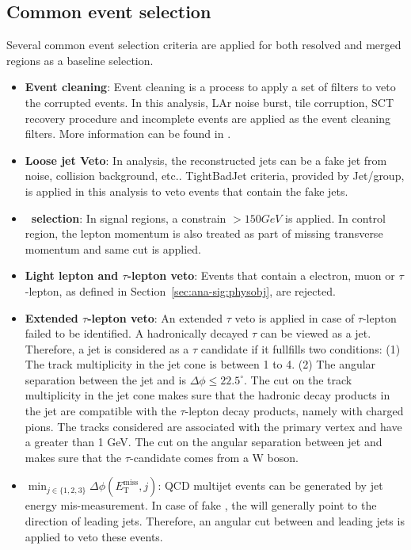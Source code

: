 \subsection{Common event selection}
\par Several common event selection criteria are applied for both resolved and merged regions as a baseline selection.
\begin{itemize}
    \item \textbf{Event cleaning}: Event cleaning is a process to apply a set of filters to veto the corrupted events. In this analysis, LAr noise burst, tile corruption, SCT recovery procedure and incomplete events are applied as the event cleaning filters. More information can be found in \cite{c8-evt-cleaning}.
    \item \textbf{Loose jet Veto}: In analysis, the reconstructed jets can be a fake jet from noise, collision background, etc.. TightBadJet criteria, provided by Jet/\met group, is applied in this analysis to veto events that contain the fake jets.
    \item \textbf{\met~selection}: In signal regions, a constrain \met $>150GeV$ is applied. In control region, the lepton momentum is also treated as part of missing transverse momentum and same \met cut is applied.
    \item \textbf{Light lepton and $\tau$-lepton veto}: Events that contain a electron, muon or $\tau$-lepton, as defined in Section~\ref{sec:ana-sig:physobj}, are rejected.
    \item \textbf{Extended $\tau$-lepton veto}: An extended $\tau$ veto is applied in case of $\tau$-lepton failed to be identified. A hadronically decayed $\tau$ can be viewed as a jet. Therefore, a jet is considered as a $\tau$ candidate if it fullfills two conditions: (1) The track multiplicity in the jet cone is between 1 to 4. (2) The angular separation between the jet and \met is $\Delta \phi \leq 22.5^\circ$. The cut on the track multiplicity in the jet cone makes sure that the hadronic decay products in the jet are compatible with the $\tau$-lepton decay products, namely with charged pions. The tracks considered are associated with the primary vertex and have a \pt greater than 1 GeV. The cut on the angular separation between jet and \met makes sure that the $\tau$-candidate comes from a W boson.
    \item \textbf{$\min_{j \in \{1,2,3\}}\Delta\phi(E_{\mathrm{T}}^{\mathrm{miss}},j)$}: QCD multijet events can be generated by jet energy mis-measurement. In case of fake \met, the \met will generally point to the direction of leading jets. Therefore, an angular cut between \met and leading jets is applied to veto these events.
\end{itemize}

